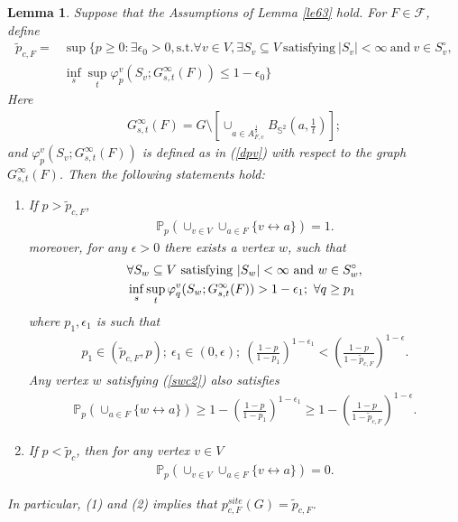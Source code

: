 \documentclass[11pt]{amsart}
\theoremstyle{plain}
\newtheorem{lemma}[theorem]{Lemma}
\numberwithin{equation}{section}
\numberwithin{figure}{section}
\newcommand\PP{{\mathbb P}}
\begin{document}
\begin{lemma}\label{l311}Suppose that the Assumptions of Lemma \ref{le63} hold. For $F\in\mathcal{F}$, define
\begin{align*}
    \tilde{p}_{c,F}=&\sup\{p\geq 0:\exists \epsilon_0>0, \mathrm{s.t.}\forall v\in V, \exists S_v\subseteq V\ \mathrm{satisfying}\ |S_v|<\infty\ \mathrm{and}\ v\in S_v^{\circ},\\
    &\inf_s\sup_t\varphi_p^{v}(S_v;G_{s,t}^{\infty}(F))\leq 1-\epsilon_0\}
\end{align*}
Here 
\begin{align*}
G_{s,t}^{\infty}(F)=G\setminus \left[\cup_{a\in A_{F,c}^{\frac{1}{s}}}B_{\mathbb{S}^2}\left(a,\frac{1}{t}\right)\right];
\end{align*}
and $\varphi_p^{v}(S_v;G_{s,t}^{\infty}(F))$ is defined as in (\ref{dpv}) with respect to the graph $G_{s,t}^{\infty}(F)$.
Then the following statements hold:
\begin{enumerate}
    \item If $p>\tilde{p}_{c,F}$, 
    \begin{align}
    \PP_p(\cup_{v\in V}\cup_{a\in F}\{v\leftrightarrow a\})=1.\label{pf1}
    \end{align}
    moreover, for any $\epsilon>0$ there exists a vertex $w$,  such that 
    \begin{align}
    \label{swc2}
    &\forall S_w\subseteq V\ \mathrm{satisfying}\ |S_w|<\infty\ \mathrm{and}\ w\in S_{w}^{\circ},\\
    &\inf_s\sup_t\varphi_q^{v}(S_w;G_{s,t}^{\infty}(F))> 1-\epsilon_1;\ \forall q\geq p_1\notag
    \end{align}
    where $p_1,\epsilon_1$ is such that 
    \begin{align}
    p_1\in (\tilde{p}_{c,F},p);\ \epsilon_1\in(0,\epsilon);\ \left(\frac{1-p}{1-p_1}\right)^{1-\epsilon_1}<\left(\frac{1-p}{1-\tilde{p}_{c,F}}\right)^{1-\epsilon}.\label{pepe}
    \end{align}
    Any vertex $w$ satisfying (\ref{swc2}) also satisfies
    \begin{align}
    \mathbb{P}_p(\cup_{a\in  F}\{w\leftrightarrow a\})\geq 1-\left(\frac{1-p}{1-p_1}\right)^{1-\epsilon_1}\geq 1-\left(\frac{1-p}{1-\tilde{p}_{c,F}}\right)^{1-\epsilon}.\label{lbi2}
    \end{align}
    \item If $p<\tilde{p}_c$, then for any vertex $v\in V$
    \begin{align}
        \PP_p(\cup_{v\in V}\cup_{a\in F}\{v\leftrightarrow a\})=0.\label{lbc2}
    \end{align}
\end{enumerate}
In particular, (1) and (2) implies that $p_{c,F}^{site}(G)=\tilde{p}_{c,F}$.
\end{lemma}
\end{document}
